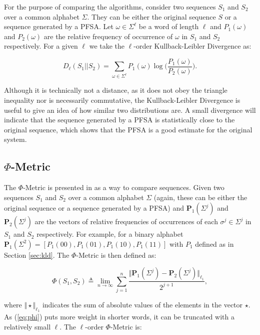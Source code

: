 {For the purpose of comparing the algorithms, consider two sequences $S_1$ and $S_2$ over a common alphabet $\Sigma$. They can be either the original sequence $S$ or a sequence generated by a PFSA. Let $\omega\in\Sigma^{\ell}$ be a word of length $\ell$ and $P_1(\omega)$ and $P_2(\omega)$ are the relative frequency of occurrence of $\omega$ in $S_1$ and $S_2$ respectively. For a given $\ell$ we take the $\ell$-order Kullback-Leibler Divergence as: 

\begin{equation}
D_{\ell}(S_1||S_2) = \sum_{\omega\in\Sigma^{\ell}}P_1(\omega)\log\Big(\frac{P_1(\omega)}{P_2(\omega)}\Big).	\label{eq:kldl}
\end{equation}

\noindent Although it is technically not a distance, as it does not obey the triangle inequality nor is necessarily commutative, the Kullback-Leibler Divergence is useful to give an idea of how similar two distributions are. A small divergence will indicate that the sequence generated by a PFSA is statistically close to the original sequence, which shows that the PFSA is a good estimate for the original system.

\subsection{$\Phi$-Metric}

The $\Phi$-Metric is presented in \citep{asok.14} as a way to compare sequences. Given two sequences $S_1$ and $S_2$ over a common alphabet $\Sigma$ (again, these can be either the original sequence or a sequence generated by a PFSA) and  $\textbf{P}_1(\Sigma^j)$ and $\textbf{P}_2(\Sigma^j)$ are the vectors of relative frequencies of occurrences of each $\sigma^j\in\Sigma^j$ in $S_1$ and $S_2$ respectively. For example, for a binary alphabet $\textbf{P}_1(\Sigma^2) = [P_1(00), P_1(01), P_1(10), P_1(11)]$ with $P_1$ defined as in Section \ref{sec:kld}. The $\Phi$-Metric is then defined as:

\begin{equation}
\Phi(S_1, S_2) \triangleq \lim_{n\rightarrow\infty} \sum_{j = 1}^n \frac{\Vert \textbf{P}_1(\Sigma^j)-\textbf{P}_2(\Sigma^j)\Vert_{\ell_1}}{2^{j + 1}},\label{eq:phi}
\end{equation}

\noindent where $\Vert\star\Vert_{\ell_1}$ indicates the sum of absolute values of the elements in the vector $\star$. As (\ref{eq:phi}) puts more weight in shorter words, it can be truncated with a relatively small $\ell$. The $\ell$-order $\Phi$-Metric is:

}
